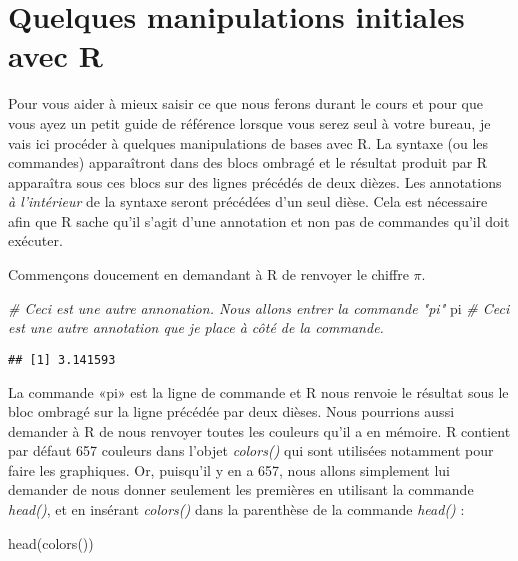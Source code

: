 \documentclass[
]{book}
\newenvironment{Shaded}{\begin{snugshade}}{\end{snugshade}}
\newcommand{\CommentTok}[1]{\textcolor[rgb]{0.56,0.35,0.01}{\textit{#1}}}
\newcommand{\FunctionTok}[1]{\textcolor[rgb]{0.00,0.00,0.00}{#1}}
\newcommand{\NormalTok}[1]{#1}
\begin{document}
\hypertarget{quelques-manipulations-initiales-avec-r}{%
\section{Quelques manipulations initiales avec R}\label{quelques-manipulations-initiales-avec-r}}

Pour vous aider à mieux saisir ce que nous ferons durant le cours et pour que vous ayez un petit guide de référence lorsque vous serez seul à votre bureau, je vais ici procéder à quelques manipulations de bases avec R. La syntaxe (ou les commandes) apparaîtront dans des blocs ombragé et le résultat produit par R apparaîtra sous ces blocs sur des lignes précédés de deux dièzes. Les annotations \emph{à l'intérieur} de la syntaxe seront précédées d'un seul dièse. Cela est nécessaire afin que R sache qu'il s'agit d'une annotation et non pas de commandes qu'il doit exécuter.

Commençons doucement en demandant à R de renvoyer le chiffre \(\pi\).

\begin{Shaded}
\begin{Highlighting}[]
\CommentTok{\# Ceci est une autre annonation. Nous allons entrer la commande "pi"}
\NormalTok{pi }\CommentTok{\# Ceci est une autre annotation que je place à côté de la commande.}
\end{Highlighting}
\end{Shaded}

\begin{verbatim}
## [1] 3.141593
\end{verbatim}

La commande «pi» est la ligne de commande et R nous renvoie le résultat sous le bloc ombragé sur la ligne précédée par deux dièses. Nous pourrions aussi demander à R de nous renvoyer toutes les couleurs qu'il a en mémoire. R contient par défaut 657 couleurs dans l'objet \emph{colors()} qui sont utilisées notamment pour faire les graphiques. Or, puisqu'il y en a 657, nous allons simplement lui demander de nous donner seulement les premières en utilisant la commande \emph{head()}, et en insérant \emph{colors()} dans la parenthèse de la commande \emph{head()} :

\begin{Shaded}
\begin{Highlighting}[]
\FunctionTok{head}\NormalTok{(}\FunctionTok{colors}\NormalTok{())}
\end{Highlighting}
\end{Shaded}
\end{document}
